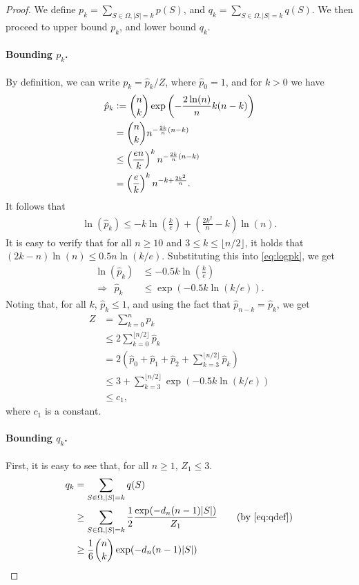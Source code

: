 \begin{proof}
We define $p_k = \sum_{S \in \Omega, |S| = k} p(S)$, and $q_k = \sum_{S \in \Omega, |S| = k} q(S)$.
We then proceed to upper bound $p_k$, and lower bound $q_k$.

\paragraph{Bounding $p_k$.}
By definition, we can write $p_k = \hat{p}_k / Z$, where $\hat{p}_0 = 1$, and for $k > 0$ we have
\begin{align*}
\hat{p}_k &\vcentcolon= \binom{n}{k} \exp\left(-\frac{2\ln(n)}{n} k(n-k)\right)\\
            &= \binom{n}{k} n^{-\frac{2k}{n} (n-k)}\\
            &\leq \left(\frac{en}{k}\right)^k n^{-\frac{2k}{n} (n-k)}\\
            &= \left(\frac{e}{k}\right)^k n^{-k + \frac{2k^2}{n}}.
\end{align*}
It follows that
\begin{align} \label{eq:logpk}
  \ln(\hat{p}_k) \leq -k \ln\left(\frac{k}{e}\right) + \left(\frac{2k^2}{n} - k\right)\ln(n).
\end{align}
It is easy to verify that for all $n \geq 10$ and $3 \leq k \leq \lfloor n/2 \rfloor$, it holds that $(2k-n)\ln(n) \leq 0.5n\ln(k/e)$.
Substituting this into \eqref{eq:logpk}, we get
\begin{align*}
            \ln(\hat{p}_k) &\leq -0.5k\ln\left(\frac{k}{e}\right)\\
  \Rightarrow\ \ \hat{p}_k &\leq \exp(-0.5k\ln(k/e)).
\end{align*}
Noting that, for all $k$, $\hat{p}_k \leq 1$, and using the fact that $\hat{p}_{n-k} = \hat{p}_k$, we get
\begin{align}
  Z &= \sum_{k = 0}^n \hat{p}_k \nonumber\\ 
    &\leq 2\sum_{k = 0}^{\lfloor n/2 \rfloor} \hat{p}_ k\nonumber\\
    &= 2(\hat{p}_0 + \hat{p}_1 + \hat{p}_2 + \sum_{k = 3}^{\lfloor n/2 \rfloor} \hat{p}_k) \nonumber\\
    &\leq 3 + \sum_{k = 3}^{\lfloor n/2 \rfloor} \exp(-0.5k\ln(k/e)) \nonumber\\
    &\leq c_1, \label{eq:Zconst}
\end{align}
where $c_1$ is a constant.

\paragraph{Bounding $q_k$.}
First, it is easy to see that, for all $n \geq 1$, $Z_1 \leq 3$.
\begin{align*}
  q_k &= \sum_{S \in \Omega, |S| = k} q(S)\\
      &\geq \sum_{S \in \Omega, |S| = k} \frac{1}{2} \frac{\exp(-\dn (n-1)|S|)}{Z_1} \tag{by \eqref{eq:qdef}} \\
      &\geq \frac{1}{6} \binom{n}{k} \exp(-\dn (n-1)|S|)
\end{align*}


\end{proof}
